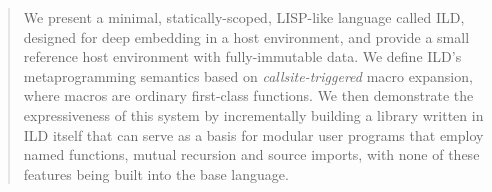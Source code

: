 \begin{abstract}
We present a minimal, statically-scoped, LISP-like language called ILD,
designed for deep embedding in a host environment, and provide a small
reference host environment with fully-immutable data.
We define ILD's metaprogramming semantics based on
\emph{callsite-triggered} macro expansion, where macros are ordinary
first-class functions. We then demonstrate the expressiveness of this system by
incrementally building a library written in ILD itself that can serve as a
basis for modular user programs that employ named functions, mutual recursion
and source imports, with none of these features being built into the base
language.
\end{abstract}
